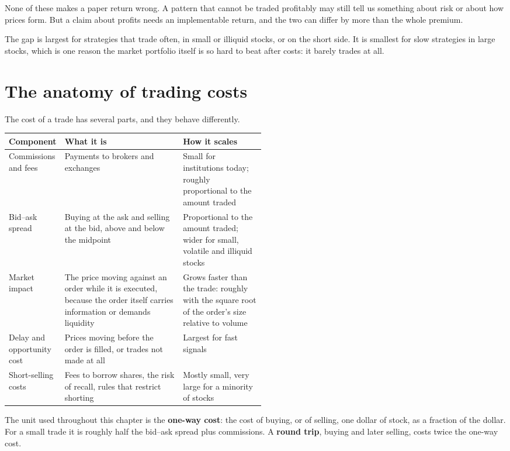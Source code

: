 None of these makes a paper return wrong. A pattern that cannot be traded profitably may still tell us something about risk or about how prices form. But a claim about profits needs an implementable return, and the two can differ by more than the whole premium.

The gap is largest for strategies that trade often, in small or illiquid stocks, or on the short side. It is smallest for slow strategies in large stocks, which is one reason the market portfolio itself is so hard to beat after costs: it barely trades at all.

\section{The anatomy of trading costs}
\label{sec:17-anatomy}

The cost of a trade has several parts, and they behave differently.

\begin{center}
\small
\begin{tabularx}{0.9\linewidth}{@{}>{\raggedright\arraybackslash}p{0.19\linewidth}>{\raggedright\arraybackslash}X>{\raggedright\arraybackslash}p{0.32\linewidth}@{}}
\toprule
Component & What it is & How it scales \\
\midrule
Commissions and fees & Payments to brokers and exchanges & Small for institutions today; roughly proportional to the amount traded \\
Bid--ask spread & Buying at the ask and selling at the bid, above and below the midpoint & Proportional to the amount traded; wider for small, volatile and illiquid stocks \\
Market impact & The price moving against an order while it is executed, because the order itself carries information or demands liquidity & Grows faster than the trade: roughly with the square root of the order's size relative to volume \\
Delay and opportunity cost & Prices moving before the order is filled, or trades not made at all & Largest for fast signals \\
Short-selling costs & Fees to borrow shares, the risk of recall, rules that restrict shorting & Mostly small, very large for a minority of stocks \\
\bottomrule
\end{tabularx}
\end{center}

The unit used throughout this chapter is the \textbf{one-way cost}: the cost of buying, or of selling, one dollar of stock, as a fraction of the dollar. For a small trade it is roughly half the bid--ask spread plus commissions. A \textbf{round trip}, buying and later selling, costs twice the one-way cost.

